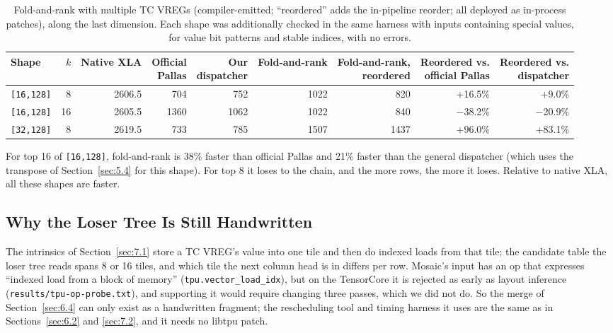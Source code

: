 \documentclass[sigconf,nonacm,balance=false]{acmart}
\newcommand{\code}[1]{\texttt{#1}}
\begin{document}
\begin{table}
\centering
\caption{Fold-and-rank with multiple TC VREGs (compiler-emitted; ``reordered'' adds the in-pipeline reorder; all deployed as in-process patches), along the last dimension. Each shape was additionally checked in the same harness with inputs containing special values, for value bit patterns and stable indices, with no errors.}
\label{tab:17}
\begin{tabular}{lrrrrrrrr}
\toprule
Shape & $k$ & Native XLA & \makecell[rb]{Official\\Pallas} & \makecell[rb]{Our\\dispatcher} & Fold-and-rank & \makecell[rb]{Fold-and-rank,\\reordered} & \makecell[rb]{Reordered vs.\\official Pallas} & \makecell[rb]{Reordered vs.\\dispatcher} \\
\midrule
\code{[16,\allowbreak{}128]} & 8 & 2606.5 & 704 & 752 & 1022 & 820 & +16.5\% & +9.0\% \\
\code{[16,\allowbreak{}128]} & 16 & 2605.5 & 1360 & 1062 & 1022 & 840 & $-$38.2\% & $-$20.9\% \\
\code{[32,\allowbreak{}128]} & 8 & 2619.5 & 733 & 785 & 1507 & 1437 & +96.0\% & +83.1\% \\
\bottomrule
\end{tabular}
\end{table}

For top 16 of \code{[16,\allowbreak{}128]}, fold-and-rank is 38\% faster than official Pallas and 21\% faster than the general dispatcher (which uses the transpose of Section~\ref{sec:5.4} for this shape). For top 8 it loses to the chain, and the more rows, the more it loses. Relative to native XLA, all these shapes are faster.

\subsection{Why the Loser Tree Is Still Handwritten}
\label{sec:7.5}

The intrinsics of Section~\ref{sec:7.1} store a TC VREG's value into one tile and then do indexed loads from that tile; the candidate table the loser tree reads spans 8 or 16 tiles, and which tile the next column head is in differs per row. Mosaic's input has an op that expresses ``indexed load from a block of memory'' (\code{tpu.\allowbreak{}vector\_\allowbreak{}load\_\allowbreak{}idx}), but on the TensorCore it is rejected as early as layout inference (\code{results/\allowbreak{}tpu-op-probe.\allowbreak{}txt}), and supporting it would require changing three passes, which we did not do. So the merge of Section~\ref{sec:6.4} can only exist as a handwritten fragment; the rescheduling tool and timing harness it uses are the same as in Sections~\ref{sec:6.2} and \ref{sec:7.2}, and it needs no libtpu patch.
\end{document}
